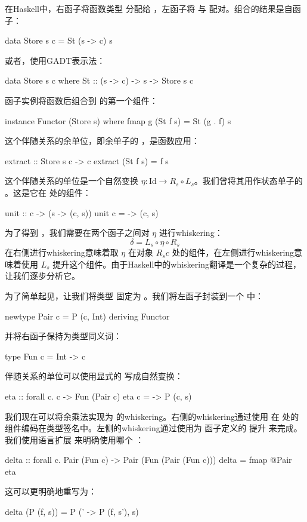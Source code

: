 \documentclass[DaoFP]{subfiles}
\begin{document}
在Haskell中，右函子将函数类型  分配给 ，左函子将  与  配对。组合的结果是自函子：
\begin{haskell}
data Store s c = St (s -> c) s
\end{haskell}
或者，使用GADT表示法：
\begin{haskell}
data Store s c where
    St :: (s -> c) -> s -> Store s c
\end{haskell}
函子实例将函数后组合到  的第一个组件：
\begin{haskell}
instance Functor (Store s) where
  fmap g (St f s) = St (g . f) s
\end{haskell}

这个伴随关系的余单位，即余单子的 ，是函数应用：
\begin{haskell}
extract :: Store s c -> c
extract (St f s) = f s
\end{haskell}
这个伴随关系的单位是一个自然变换 $\eta \colon \text{Id} \to R_s \circ L_s$。我们曾将其用作状态单子的 。这是它在  处的组件：
\begin{haskell}
unit :: c -> (s -> (c, s))
unit c = \s -> (c, s)
\end{haskell}
为了得到 ，我们需要在两个函子之间对 $\eta$ 进行whiskering：
\[ \delta = L_s  \circ \eta \circ R_s \]
在右侧进行whiskering意味着取 $\eta$ 在对象 $R_s c$ 处的组件，在左侧进行whiskering意味着使用 $L_s$ 提升这个组件。由于Haskell中的whiskering翻译是一个复杂的过程，让我们逐步分析它。

为了简单起见，让我们将类型  固定为 。我们将左函子封装到一个  中：
\begin{haskell}
newtype Pair c = P (c, Int)
  deriving Functor
\end{haskell}
并将右函子保持为类型同义词：
\begin{haskell}
type Fun c = Int -> c
\end{haskell}
伴随关系的单位可以使用显式的  写成自然变换：
\begin{haskell}
eta :: forall c. c -> Fun (Pair c)
eta c = \s -> P (c, s)
\end{haskell}

我们现在可以将余乘法实现为  的whiskering。右侧的whiskering通过使用  在  处的组件编码在类型签名中。左侧的whiskering通过使用为  函子定义的  提升  来完成。我们使用语言扩展  来明确使用哪个 ：
\begin{haskell}
delta :: forall c. Pair (Fun c) -> Pair (Fun (Pair (Fun c)))
delta = fmap @Pair eta
\end{haskell}
这可以更明确地重写为：
\begin{haskell}
delta (P (f, s)) = P (\s' -> P (f, s'), s)
\end{haskell}
\end{document}
